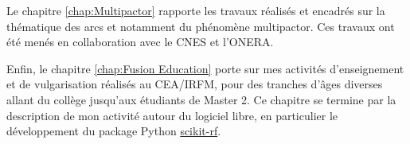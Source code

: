 Le chapitre \ref{chap:Multipactor} rapporte les travaux réalisés et encadrés sur la thématique des arcs et notamment du phénomène multipactor. Ces travaux ont été menés en collaboration avec le CNES et l'ONERA.

Enfin, le chapitre \ref{chap:Fusion Education} porte sur mes activités d'enseignement et de vulgarisation réalisés au CEA/IRFM, pour des tranches d'âges diverses allant du collège jusqu'aux étudiants de Master 2. Ce chapitre se termine par la description de mon activité autour du logiciel libre, en particulier le développement du package Python \href{http://scikit-rf.org/}{scikit-rf}.




